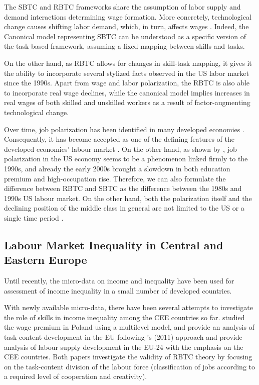 \documentclass[11pt]{article}
\begin{document}
The SBTC and RBTC frameworks share the assumption of labor supply and demand interactions determining wage formation. More concretely, technological change causes shifting labor demand, which, in turn, affects wages \citep{mishel2013assessing}. Indeed, the Canonical model representing SBTC can be understood as a specific version of the task-based framework, assuming a fixed mapping between skills and tasks.

On the other hand, as RBTC allows for changes in skill-task mapping, it gives it the ability to incorporate several stylized facts observed in the US labor market since the 1990s. Apart from wage and labor polarization, the RBTC is also able to incorporate real wage declines, while the canonical model implies increases in real wages of both skilled and unskilled workers as a result of factor-augmenting technological change.


 Over time, job polarization has been identified in many developed economies \citep{rodrik2020economic, oecd2017}. Consequently, it has become accepted as one of the defining features of the developed economies' labour market \citep{howell2019declining}. On the other hand, as shown by \citet{mishel2013assessing}, job polarization in the US economy seems to be a phenomenon linked firmly to the 1990s, and already the early 2000s brought a slowdown in both education premium and high-occupation rise. Therefore, we can also formulate the difference between RBTC and SBTC as the difference between the 1980s and 1990s US labour market. On the other hand, both the polarization itself and the declining position of the middle class in general are not limited to the US or a single time period \citep{temin2018vanishing, rodrik2020economic}.


\subsection{Labour Market Inequality in Central and Eastern Europe}
Until recently, the micro-data on income and inequality have been used for assessment of income inequality in a small number of developed countries.

With newly available micro-data, there have been several attempts to investigate the role of skills in income inequality among the CEE countries so far. \citet{arendt2019technical} studied the wage premium in Poland using a multilevel model, and \citet{hardy2018educational} provide an analysis of task content development in the EU following \citeauthor{acemoglu2011skills}'s (2011) approach and provide analysis of labour supply development in the EU-24 with the emphasis on the CEE countries. Both papers investigate the validity of RBTC theory by focusing on the task-content division of the labour force (classification of jobs according to a required level of cooperation and creativity).
\end{document}
